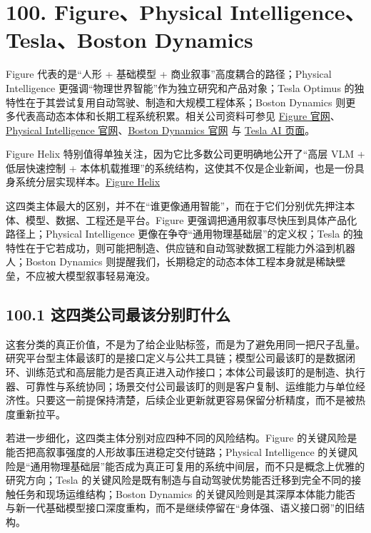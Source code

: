 \chapter*{100. Figure、Physical Intelligence、Tesla、Boston Dynamics}

Figure 代表的是“人形 + 基础模型 + 商业叙事”高度耦合的路径；Physical Intelligence 更强调“物理世界智能”作为独立研究和产品对象；Tesla Optimus 的独特性在于其尝试复用自动驾驶、制造和大规模工程体系；Boston Dynamics 则更多代表高动态本体和长期工程系统积累。相关公司资料可参见 \href{https://www.figure.ai/}{Figure 官网}、\href{https://www.physicalintelligence.company/}{Physical Intelligence 官网}、\href{https://bostondynamics.com/}{Boston Dynamics 官网} 与 \href{https://www.tesla.com/AI}{Tesla AI 页面}。

Figure Helix 特别值得单独关注，因为它比多数公司更明确地公开了“高层 VLM + 低层快速控制 + 本体机载推理”的系统结构，这使其不仅是企业新闻，也是一份具身系统分层实现样本。\href{https://www.figure.ai/news/helix}{Figure Helix}

这四类主体最大的区别，并不在“谁更像通用智能”，而在于它们分别优先押注本体、模型、数据、工程还是平台。Figure 更强调把通用叙事尽快压到具体产品化路径上；Physical Intelligence 更像在争夺“通用物理基础层”的定义权；Tesla 的独特性在于它若成功，则可能把制造、供应链和自动驾驶数据工程能力外溢到机器人；Boston Dynamics 则提醒我们，长期稳定的动态本体工程本身就是稀缺壁垒，不应被大模型叙事轻易淹没。

\section*{100.1 这四类公司最该分别盯什么}


这套分类的真正价值，不是为了给企业贴标签，而是为了避免用同一把尺子乱量。研究平台型主体最该盯的是接口定义与公共工具链；模型公司最该盯的是数据闭环、训练范式和高层能力是否真正进入动作接口；本体公司最该盯的是制造、执行器、可靠性与系统协同；场景交付公司最该盯的则是客户复制、运维能力与单位经济性。只要这一前提保持清楚，后续企业更新就更容易保留分析精度，而不是被热度重新拉平。

若进一步细化，这四类主体分别对应四种不同的风险结构。Figure 的关键风险是能否把高叙事强度的人形故事压进稳定交付链路；Physical Intelligence 的关键风险是“通用物理基础层”能否成为真正可复用的系统中间层，而不只是概念上优雅的研究方向；Tesla 的关键风险是既有制造与自动驾驶优势能否迁移到完全不同的接触任务和现场运维结构；Boston Dynamics 的关键风险则是其深厚本体能力能否与新一代基础模型接口深度重构，而不是继续停留在“身体强、语义接口弱”的旧结构。

